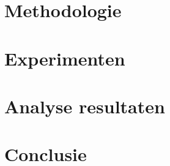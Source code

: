 \documentclass{hogent-article}
\begin{document}
	
	\section{Methodologie}
	

	
	\section{Experimenten}
	

	
	\section{Analyse resultaten}
	

	
	\section{Conclusie}
	

	
	
	\printbibliography[heading=bibintoc]
	
\end{document}
